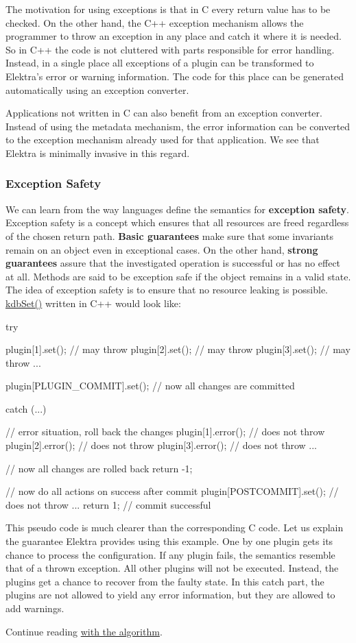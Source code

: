 The motivation for using exceptions is that in C every return value has to be checked. On the other hand, the C++ exception mechanism allows the programmer to throw an exception in any place and catch it where it is needed. So in C++ the code is not cluttered with parts responsible for error handling. Instead, in a single place all exceptions of a plugin can be transformed to Elektra's error or warning information. The code for this place can be generated automatically using an exception converter.

Applications not written in C can also benefit from an exception converter. Instead of using the metadata mechanism, the error information can be converted to the exception mechanism already used for that application. We see that Elektra is minimally invasive in this regard.

\subsubsection*{Exception Safety}

We can learn from the way languages define the semantics for {\bfseries exception safety}. Exception safety is a concept which ensures that all resources are freed regardless of the chosen return path. {\bfseries Basic guarantees} make sure that some invariants remain on an object even in exceptional cases. On the other hand, {\bfseries strong guarantees} assure that the investigated operation is successful or has no effect at all. Methods are said to be exception safe if the object remains in a valid state. The idea of exception safety is to ensure that no resource leaking is possible. {\ttfamily \hyperlink{group__kdb_ga11436b058408f83d303ca5e996832bcf}{kdb\+Set()}} written in C++ would look like\+: \begin{DoxyVerb}    try {
            plugin[1].set(); // may throw plugin[2].set(); // may
            throw plugin[3].set(); // may throw ...

            plugin[PLUGIN_COMMIT].set(); // now all changes are
            committed
    } catch (...) {
            // error situation, roll back the changes
            plugin[1].error(); // does not throw plugin[2].error();
            // does not throw plugin[3].error(); // does not throw ...

            // now all changes are rolled back return -1;
    } // now do all actions on success after commit
    plugin[POSTCOMMIT].set(); // does not throw ...  return 1; //
    commit successful
\end{DoxyVerb}


This pseudo code is much clearer than the corresponding C code. Let us explain the guarantee Elektra provides using this example. One by one plugin gets its chance to process the configuration. If any plugin fails, the semantics resemble that of a thrown exception. All other plugins will not be executed. Instead, the plugins get a chance to recover from the faulty state. In this catch part, the plugins are not allowed to yield any error information, but they are allowed to add warnings.

Continue reading \hyperlink{md_doc_help_elektra-algorithm_doc_help_elektra-algorithm_md}{with the algorithm}. 